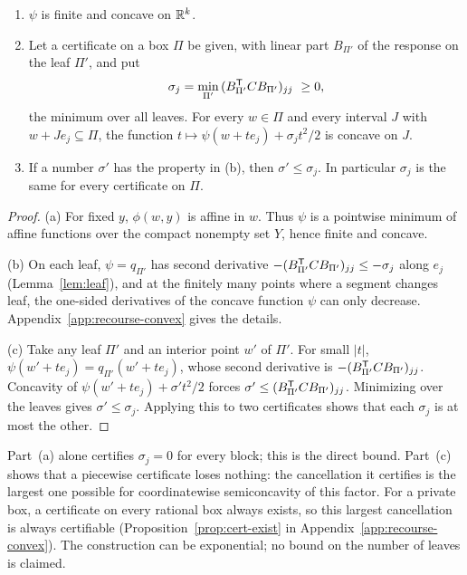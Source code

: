 \begin{proposition}\label{prop:vf-curv}
\begin{enumerate}
\item[(a)] $\psi$ is finite and concave on $\mathbb R^k$.
\item[(b)] Let a certificate on a box $\Pi$ be given, with linear part
$B_{\Pi'}$ of the response on the leaf $\Pi'$, and put
\[
\sigma_j=\min_{\Pi'}\,(B_{\Pi'}^{\T}CB_{\Pi'})_{jj}\ \ge0,
\]
the minimum over all leaves. For every $w\in\Pi$ and every interval $J$
with $w+Je_j\subseteq\Pi$, the function $t\mapsto\psi(w+te_j)+\sigma_jt^2/2$
is concave on $J$.
\item[(c)] If a number $\sigma'$ has the property in (b), then
$\sigma'\le\sigma_j$. In particular $\sigma_j$ is the same for every
certificate on $\Pi$.
\end{enumerate}
\end{proposition}

\begin{proof}
(a) For fixed $y$, $\phi(w,y)$ is affine in $w$. Thus $\psi$ is a pointwise
minimum of affine functions over the compact nonempty set $Y$, hence finite
and concave.

(b) On each leaf, $\psi=q_{\Pi'}$ has second derivative
$-(B_{\Pi'}^{\mathsf T}CB_{\Pi'})_{jj}\le-\sigma_j$ along $e_j$
(Lemma~\ref{lem:leaf}), and at the finitely many points where a segment
changes leaf, the one-sided derivatives of the concave function $\psi$ can
only decrease. Appendix~\ref{app:recourse-convex} gives the details.

(c) Take any leaf $\Pi'$ and an interior point $w'$ of $\Pi'$. For small
$|t|$, $\psi(w'+te_j)=q_{\Pi'}(w'+te_j)$, whose second derivative is
$-(B_{\Pi'}^{\mathsf T}CB_{\Pi'})_{jj}$. Concavity of $\psi(w'+te_j)+\sigma't^2/2$
forces $\sigma'\le(B_{\Pi'}^{\mathsf T}CB_{\Pi'})_{jj}$. Minimizing over the leaves
gives $\sigma'\le\sigma_j$. Applying this to two certificates shows that
each $\sigma_j$ is at most the other.
\end{proof}

Part~(a) alone certifies $\sigma_j=0$ for every block; this is the direct
bound. Part~(c) shows that a piecewise certificate loses nothing: the
cancellation it certifies is the largest one possible for coordinatewise
semiconcavity of this factor. For a private box, a certificate on every
rational box always exists, so this largest cancellation is always
certifiable (Proposition~\ref{prop:cert-exist} in
Appendix~\ref{app:recourse-convex}). The construction can be exponential; no
bound on the number of leaves is claimed.

